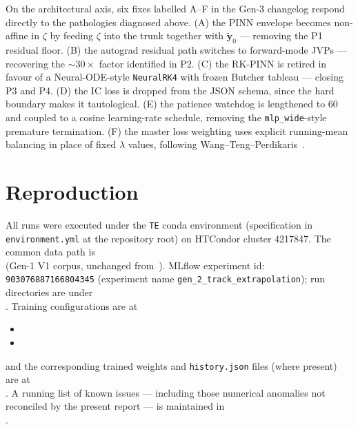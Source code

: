 \documentclass[a4paper,11pt]{article}
\newcommand{\state}{\mathbf{y}}
\begin{document}
On the architectural axis, six fixes labelled A--F in the Gen-3
changelog respond directly to the pathologies diagnosed above. (A) the
PINN envelope becomes non-affine in $\zeta$ by feeding $\zeta$ into the
trunk together with $\tilde{\state}_0$ --- removing the P1 residual
floor. (B) the autograd residual path switches to forward-mode JVPs
--- recovering the $\sim\!30\times$ factor identified in P2. (C) the
RK-PINN is retired in favour of a Neural-ODE-style
\texttt{NeuralRK4} with frozen Butcher tableau --- closing P3 and P4.
(D) the IC loss is dropped from the JSON schema, since the hard boundary
makes it tautological. (E) the patience watchdog is lengthened to 60
and coupled to a cosine learning-rate schedule, removing the
\texttt{mlp\_wide}-style premature termination. (F) the master loss
weighting uses explicit running-mean balancing in place of fixed
$\lambda$ values, following Wang--Teng--Perdikaris~\cite{wang2021ntk}.

\section{Reproduction}\label{gen2old:sec:repro}

\begin{sloppypar}
All runs were executed under the \texttt{TE} conda environment
(specification in \texttt{environment.yml} at the repository root) on
HTCondor cluster 4217847. The common data path is\\
(Gen-1 V1 corpus, unchanged from~\cite{gen1report}).
MLflow experiment id: \texttt{903076887166804345} (experiment name
\texttt{gen\_2\_track\_extrapolation}); run directories are under\\
. Training
configurations are at
\begin{itemize}
  \item {}
  \item {}
\end{itemize}
and the corresponding trained weights and \texttt{history.json} files
(where present) are at\\
.
A running list of known issues --- including those numerical anomalies
not reconciled by the present report --- is maintained in\\
.
\end{sloppypar}
\end{document}

